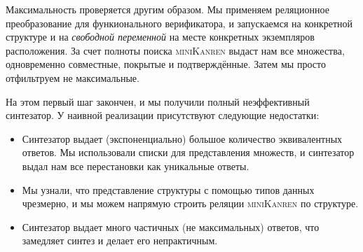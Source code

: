 Максимальность проверяется другим образом. Мы применяем реляционное преобразование для функионального верификатора, и запускаемся на конкретной структуре и
на \emph{свободной переменной} на месте конкретных экземпляров расположения. За счет полноты поиска \textsc{miniKanren} выдаст нам все множества, одновременно  совместные, покрытые и подтверждённые. Затем мы просто отфильтруем не максимальные.


На этом первый шаг закончен, и мы получили полный неэффективный синтезатор. У наивной реализации присутствуют следующие недостатки:
\begin{itemize}
\item Синтезатор выдает (экспоненциально) большое количество эквивалентных ответов. Мы использовали списки для представления множеств, и синтезатор выдал нам все перестановки как уникальные ответы.
\item Мы узнали, что представление структуры с помощью типов данных чрезмерно, и мы можем напрямую строить реляции \textsc{miniKanren} по структуре.
\item Синтезатор выдает много частичных (не максимальных) ответов, что замедляет синтез и делает его непрактичным.
\end{itemize}

